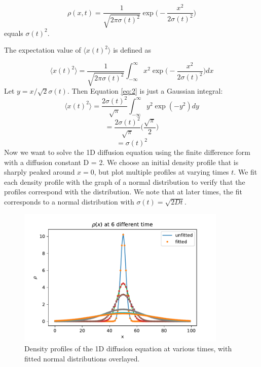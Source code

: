 \documentclass{article}
\begin{document}
\begin{equation}
\rho(x,t) = \frac{1}{\sqrt{2\pi\sigma(t)^{2}}} \exp \bigg(-\frac{x^{2}}{2\sigma(t)^{2}}\bigg)
\end{equation}
equals $\sigma(t)^{2}$.\par
\noindent The expectation value of $\langle x(t)^{2} \rangle$ is defined as

\begin{equation}
\langle x(t)^{2} \rangle = \frac{1}{\sqrt{2\pi\sigma(t)^{2}}} \int_{-\infty}^{\infty} x^{2} \exp \bigg(-\frac{x^{2}}{2\sigma(t)^{2}}\bigg) dx
\label{eq:2}
\end{equation}
Let $y = x/\sqrt{2}\sigma(t)$. Then Equation \ref{eq:2} is just a Gaussian integral:
\begin{equation}
\langle x(t)^{2} \rangle = \frac{2\sigma(t)^2}{\sqrt{\pi}} \int_{-\infty}^{\infty} y^{2} \exp(-y^{2}) dy
\end{equation}
\begin{equation}
= \frac{2\sigma(t)^2}{\sqrt{\pi}} \bigg(\frac{\sqrt{\pi}}{2}\bigg)
\end{equation}
\begin{equation}
= \sigma(t)^{2}
\end{equation}
Now we want to solve the 1D diffusion equation using the finite difference form with a diffusion constant D = 2. We choose an initial density profile that is sharply peaked around $x = 0$, but plot multiple profiles at varying times $t$. We fit each density profile with the graph of a normal distribution to verify that the profiles correspond with the distribution. We note that at later times, the fit corresponds to a normal distribution with $\sigma(t) = \sqrt{2Dt}$.\par
\begin{figure}[H]
\centering
\captionsetup{justification=centering, margin=3.5cm}
\includegraphics[width=10cm]{snapshots.pdf}
\caption{Density profiles of the 1D diffusion equation at various times, with fitted normal distributions overlayed.}
\end{figure}
\end{document}
